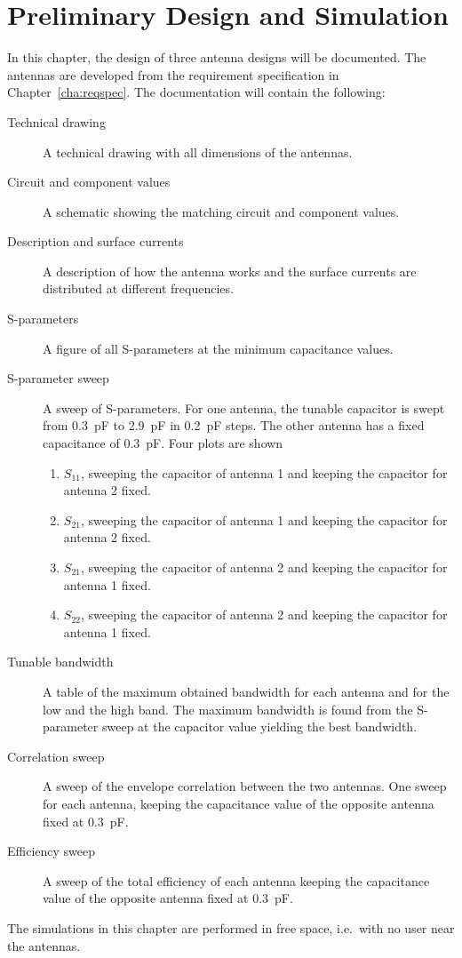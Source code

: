 \chapter{Preliminary Design and Simulation}
\label{cha:nousersim}
In this chapter, the design of three antenna designs will be documented. The antennas are developed from the requirement specification in Chapter~\ref{cha:reqspec}. The documentation will contain the following:
\begin{description}
\item[Technical drawing] A technical drawing with all dimensions of the antennas. 
\item[Circuit and component values] A schematic showing the matching circuit and component values.
\item[Description and surface currents] A description of how the antenna works and the surface currents are distributed at different frequencies.
\item[S-parameters] A figure of all S-parameters at the minimum capacitance values.
\item[S-parameter sweep] A sweep of S-parameters. For one antenna, the tunable capacitor is swept from \SI{0.3}{pF} to \SI{2.9}{pF} in \SI{0.2}{pF} steps. The other antenna has a fixed capacitance of \SI{0.3}{pF}. Four plots are shown
    \begin{enumerate}
    \item $S_{11}$, sweeping the capacitor of antenna 1 and keeping the capacitor for antenna 2 fixed.
    \item $S_{21}$, sweeping the capacitor of antenna 1 and keeping the capacitor for antenna 2 fixed.
    \item $S_{21}$, sweeping the capacitor of antenna 2 and keeping the capacitor for antenna 1 fixed.
    \item $S_{22}$, sweeping the capacitor of antenna 2 and keeping the capacitor for antenna 1 fixed.
    \end{enumerate}
\item[Tunable bandwidth] A table of the maximum obtained bandwidth for each antenna and for the low and the high band. The maximum bandwidth is found from the S-parameter sweep at the capacitor value yielding the best bandwidth.
\item[Correlation sweep] A sweep of the envelope correlation between the two antennas. One sweep for each antenna, keeping the capacitance value of the opposite antenna fixed at \SI{0.3}{pF}.
\item[Efficiency sweep] A sweep of the total efficiency of each antenna keeping the capacitance value of the opposite antenna fixed at \SI{0.3}{pF}.
\end{description}

The simulations in this chapter are performed in free space, i.e.\ with no user near the antennas.
